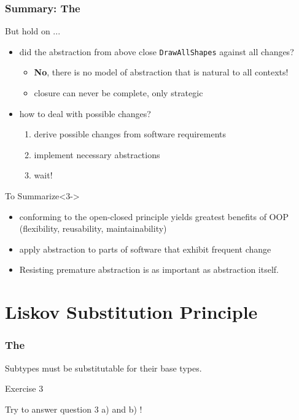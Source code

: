 \documentclass[9pt,handout]{beamer}
\begin{document}
\begin{frame}
  \frametitle{Summary: The \secname}
\begin{block}{But hold on ...}
  \begin{itemize}
  \item<1-> did the abstraction from above close \texttt{DrawAllShapes} against all changes?
    \begin{itemize}
    \item \textbf{No}, there is no model of abstraction that is natural to all
      contexts!
    \item closure can never be complete, only strategic
    \end{itemize}
  \item<2-> how to deal with possible changes?
    \begin{enumerate}
    \item derive possible changes from software requirements
    \item implement necessary abstractions
    \item wait!
    \end{enumerate}
  \end{itemize}
\end{block}
\vfill
\pause
\begin{block}{To Summarize}<3->
  \begin{itemize}
  \item conforming to the open-closed principle yields greatest benefits of OOP (flexibility, reusability, maintainability)
  \item apply abstraction to parts of software that exhibit frequent change
  \item \alert<3->{Resisting premature abstraction is as important as abstraction itself.}
  \end{itemize}
\end{block}
\end{frame}

\section{Liskov Substitution Principle}
\begin{frame}
  \frametitle{The \secname}
  \begin{theorem}
    Subtypes must be substitutable for their base types.
  \end{theorem}
\pause
\vfill
\begin{exampleblock}{Exercise 3}
  \begin{center}
    Try to answer question 3 a) and b) !
  \end{center}
\end{exampleblock}
\end{frame}
\end{document}
